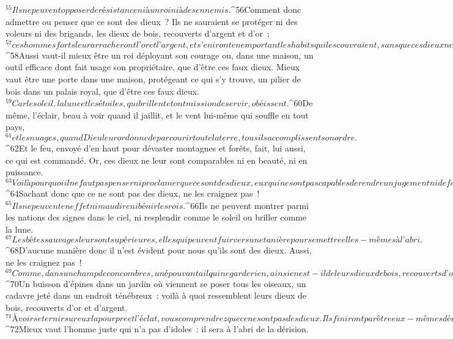 ${}^{55}Ils ne peuvent opposer de résistance ni à un roi ni à des ennemis. 
${}^{56}Comment donc admettre ou penser que ce sont des dieux ?
      Ils ne sauraient se protéger ni des voleurs ni des brigands, les dieux de bois, recouverts d’argent et d’or ; 
${}^{57}ces hommes forts leur arracheront l’or et l’argent, et s’en iront en emportant les habits qui les couvraient, sans que ces dieux ne puissent se porter secours à eux-mêmes. 
${}^{58}Aussi vaut-il mieux être un roi déployant son courage ou, dans une maison, un outil efficace dont fait usage son propriétaire, que d’être ces faux dieux. Mieux vaut être une porte dans une maison, protégeant ce qui s’y trouve, un pilier de bois dans un palais royal, que d’être ces faux dieux. 
${}^{59}Car le soleil, la lune et les étoiles, qui brillent et ont mission de servir, obéissent. 
${}^{60}De même, l’éclair, beau à voir quand il jaillit, et le vent lui-même qui souffle en tout pays, 
${}^{61}et les nuages, quand Dieu leur ordonne de parcourir toute la terre, tous ils accomplissent son ordre. 
${}^{62}Et le feu, envoyé d’en haut pour dévaster montagnes et forêts, fait, lui aussi, ce qui est commandé. Or, ces dieux ne leur sont comparables ni en beauté, ni en puissance. 
${}^{63}Voilà pourquoi il ne faut pas penser ni proclamer que ce sont des dieux, eux qui ne sont pas capables de rendre un jugement ni de faire du bien aux hommes. 
${}^{64}Sachant donc que ce ne sont pas des dieux, ne les craignez pas !
${}^{65}Ils ne peuvent en effet ni maudire ni bénir les rois. 
${}^{66}Ils ne peuvent montrer parmi les nations des signes dans le ciel, ni resplendir comme le soleil ou briller comme la lune. 
${}^{67}Les bêtes sauvages leur sont supérieures, elles qui peuvent fuir vers une tanière pour se mettre elles-mêmes à l’abri. 
${}^{68}D’aucune manière donc il n’est évident pour nous qu’ils sont des dieux. Aussi, ne les craignez pas !
${}^{69}Comme, dans un champ de concombres, un épouvantail qui ne garde rien, ainsi en est-il de leurs dieux de bois, recouverts d’or et d’argent. 
${}^{70}Un buisson d’épines dans un jardin où viennent se poser tous les oiseaux, un cadavre jeté dans un endroit ténébreux : voilà à quoi ressemblent leurs dieux de bois, recouverts d’or et d’argent. 
${}^{71}À voir se ternir sur eux la pourpre et l’éclat, vous comprendrez que ce ne sont pas des dieux. Ils finiront par être eux-mêmes dévorés et deviendront la risée du pays. 
${}^{72}Mieux vaut l’homme juste qui n’a pas d’idoles : il sera à l’abri de la dérision.
